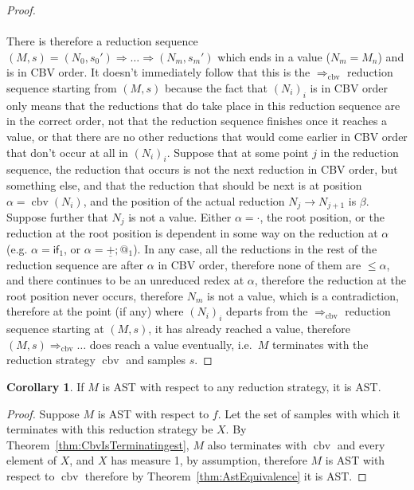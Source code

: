 \documentclass{article}
\DeclareMathOperator{\cbv}{cbv}
\theoremstyle{definition}
\theoremstyle{lemma}
\newtheorem{corollary}{Corollary}
\theoremstyle{remark}
\begin{document}
\begin{proof}
  \paragraph{}
  There is therefore a reduction sequence $(M,s) = (N_0,s_0') \Rightarrow \dots \Rightarrow (N_m, s_m')$ which ends in a value ($N_m = M_n$) and is in CBV order. It doesn't immediately follow that this is the $\Rightarrow_{\cbv}$ reduction sequence starting from $(M,s)$ because the fact that $(N_i)_i$ is in CBV order only means that the reductions that do take place in this reduction sequence are in the correct order, not that the reduction sequence finishes once it reaches a value, or that there are no other reductions that would come earlier in CBV order that don't occur at all in $(N_i)_i$. Suppose that at some point $j$ in the reduction sequence, the reduction that occurs is not the next reduction in CBV order, but something else, and that the reduction that should be next is at position $\alpha = \cbv(N_i)$, and the position of the actual reduction $N_j \to N_{j+1}$ is $\beta$. Suppose further that $N_j$ is not a value. Either $\alpha = \cdot$, the root position, or the reduction at the root position is dependent in some way on the reduction at $\alpha$ (e.g. $\alpha = \textsf{if}_1$, or $\alpha = \underline{+};@_1$). In any case, all the reductions in the rest of the reduction sequence are after $\alpha$ in CBV order, therefore none of them are $\leq \alpha$, and there continues to be an unreduced redex at $\alpha$, therefore the reduction at the root position never occurs, therefore $N_m$ is not a value, which is a contradiction, therefore at the point (if any) where $(N_i)_i$ departs from the $\Rightarrow_{\cbv}$ reduction sequence starting at $(M,s)$, it has already reached a value, therefore $(M,s) \Rightarrow_{\cbv} \dots$ does reach a value eventually, i.e.~$M$ terminates with the reduction strategy $\cbv$ and samples $s$.
\end{proof}

\begin{corollary}
If $M$ is AST with respect to any reduction strategy, it is AST.
\end{corollary}
\begin{proof}
Suppose $M$ is AST with respect to $f$. Let the set of samples with which it terminates with this reduction strategy be $X$. By Theorem~\ref{thm:CbvIsTerminatingest}, $M$ also terminates with $\cbv$ and every element of $X$, and $X$ has measure 1, by assumption, therefore $M$ is AST with respect to $\cbv$ therefore by Theorem~\ref{thm:AstEquivalence} it is AST.
\end{proof}
\end{document}
